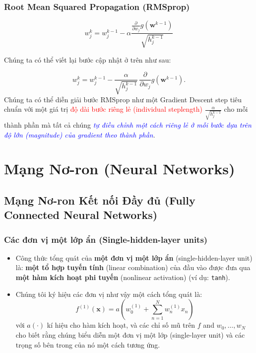 \documentclass{book}
\begin{document}
\subsection{Root Mean Squared Propagation (RMSprop)}
\begin{equation*}
    w_j^k = w_j^{k-1} - \alpha \frac{\frac{\partial}{\partial w_j} g\left(\mathbf{w}^{k-1}\right)}{\sqrt{h_j^{k-1}}}
\end{equation*}

Chúng ta có thể viết lại bước cập nhật ở trên như sau:
    
\begin{equation*}
    w_j^k = w_j^{k-1} - \frac{\alpha}{\sqrt{h_j^{k-1}}} \, \frac{\partial}{\partial w_j}g\left(\mathbf{w}^{k-1}\right).
\end{equation*}
Chúng ta có thể diễn giải bước RMSprop như một Gradient Descent step tiêu chuẩn với một giá trị \textcolor{red}{độ dài bước riêng lẻ (individual steplength)} $\frac{\alpha}{\sqrt{h_j^{k-1}}}$ cho mỗi thành phần mà tất cả chúng \textit{\textcolor{blue}{tự điều chỉnh một cách riêng lẻ ở mỗi bước dựa trên độ lớn (magnitude) của gradient theo thành phần}}.
\chapter{Mạng Nơ-ron (Neural Networks)}

\section{Mạng Nơ-ron Kết nối Đầy đủ (Fully Connected Neural Networks)}

    \subsection{Các đơn vị một lớp ẩn (Single-hidden-layer units)}
    \begin{itemize}
        \item Công thức tổng quát của \textbf{một đơn vị một lớp ẩn} (single-hidden-layer unit) là: \textbf{một tổ hợp tuyến tính} (linear combination) của đầu vào được đưa qua \textbf{một hàm kích hoạt phi tuyến} (nonlinear activation) (ví dụ: \texttt{tanh}).
        \item Chúng tôi ký hiệu các đơn vị như vậy một cách tổng quát là:
        \[
        f^{(1)}(\textbf{x}) = a\left(w^{(1)}_0 + \sum_{n=1}^{N} w^{(1)}_n x_n\right)
        \]
        với $a(\cdot)$ kí hiệu cho hàm kích hoạt, và các chỉ số mũ trên $f$ and $w_0,…,w_N$ cho biết rằng chúng biểu diễn một đơn vị một lớp (single-layer unit) và các trọng số bên trong của nó một cách tương ứng.
    \end{itemize}
    
\end{document}
